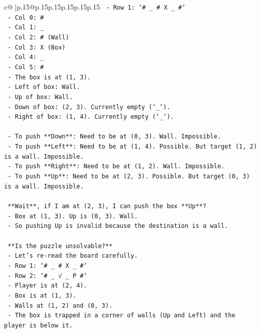 \documentclass{article}
\begin{document}
{\begin{supertabular}{c@{$\;$}|p{.15\linewidth}@{}p{.15\linewidth}p{.15\linewidth}p{.15\linewidth}p{.15\linewidth}p{.15\linewidth}}
{{{\texttt{  {-} Row 1: `\# \_ \# X \_ \#`} \\
\texttt{    {-} Col 0: \#} \\
\texttt{    {-} Col 1: \_} \\
\texttt{    {-} Col 2: \# (Wall)} \\
\texttt{    {-} Col 3: X (Box)} \\
\texttt{    {-} Col 4: \_} \\
\texttt{    {-} Col 5: \#} \\
\texttt{  {-} The box is at (1, 3).} \\
\texttt{  {-} Left of box: Wall.} \\
\texttt{  {-} Up of box: Wall.} \\
\texttt{  {-} Down of box: (2, 3). Currently empty (`\_`).} \\
\texttt{  {-} Right of box: (1, 4). Currently empty (`\_`).} \\
\\ 
\texttt{  {-} To push **Down**: Need to be at (0, 3). Wall. Impossible.} \\
\texttt{  {-} To push **Left**: Need to be at (1, 4). Possible. But target (1, 2) is a wall. Impossible.} \\
\texttt{  {-} To push **Right**: Need to be at (1, 2). Wall. Impossible.} \\
\texttt{  {-} To push **Up**: Need to be at (2, 3). Possible. But target (0, 3) is a wall. Impossible.} \\
\\ 
\texttt{  **Wait**, if I am at (2, 3), I can push the box **Up**?} \\
\texttt{  {-} Box at (1, 3). Up is (0, 3). Wall.} \\
\texttt{  {-} So pushing Up is invalid because the destination is a wall.} \\
\\ 
\texttt{  **Is the puzzle unsolvable?**} \\
\texttt{  {-} Let's re{-}read the board carefully.} \\
\texttt{  {-} Row 1: `\# \_ \# X \_ \#`} \\
\texttt{  {-} Row 2: `\# \_ √ \_ P \#`} \\
\texttt{  {-} Player is at (2, 4).} \\
\texttt{  {-} Box is at (1, 3).} \\
\texttt{  {-} Walls at (1, 2) and (0, 3).} \\
\texttt{  {-} The box is trapped in a corner of walls (Up and Left) and the player is below it.} \\
}}}
\end{supertabular}}
\end{document}
